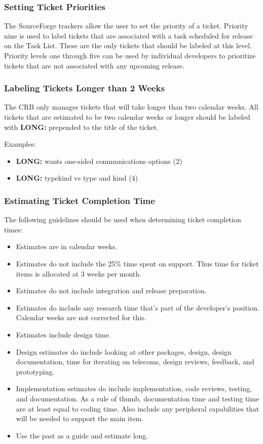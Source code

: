\subsubsection{Setting Ticket Priorities}

The SourceForge trackers allow the user to set the priority of a ticket. Priority nine is used
to label tickets that are associated with a task scheduled for release on the Task List.
These are the only tickets that should be labeled at this level. Priority levels one through 
five can be used by individual developers to prioritize tickets that are not associated with 
any upcoming release.

\subsubsection{Labeling Tickets Longer than 2 Weeks}
\label{sec:longticket}
The CRB only manages tickets that will take longer than two calendar weeks.
All tickets that are estimated to be two calendar weeks or longer should
be labeled with {\bf LONG:} prepended to the title of the ticket. 

\vspace{2mm}
Examples:
\begin{itemize}
\item  {\bf LONG:} wants one-sided communications options (2) 
\item  {\bf LONG:} typekind vs type and kind (4)
\end{itemize}

\subsubsection{Estimating Ticket Completion Time}

The following guidelines should be used when determining ticket completion times:

\begin{itemize}
\item Estimates are in calendar weeks.
\item Estimates do not include the 25\% time spent on support.  Thus
time for ticket items is allocated at 3 weeks per month.
\item Estimates do not include integration and release preparation.
\item Estimates do include any research time that's part of the developer's position. Calendar weeks are not corrected for this.
\item Estimates include design time. 
\item Design estimates do include looking at other packages, design, design documentation, time for iterating on telecoms, design reviews, feedback, and prototyping.
\item Implementation estimates do include implementation, code reviews, testing, and documentation. As a rule of thumb, documentation time and testing time are at least equal to coding time. Also include any peripheral capabilities that will be needed to support the main item.
\item Use the past as a guide and estimate long.
\end {itemize}

